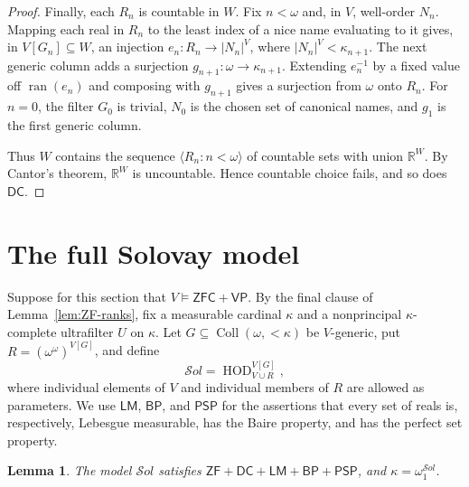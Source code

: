 \documentclass[11pt,a4paper]{amsart}
\newcommand{\VP}{\mathsf{VP}}
\newcommand{\ZF}{\mathsf{ZF}}
\newcommand{\ZFC}{\mathsf{ZFC}}
\newcommand{\HOD}{\operatorname{HOD}}
\newcommand{\Coll}{\operatorname{Coll}}
\newcommand{\DC}{\mathsf{DC}}
\newcommand{\LM}{\mathsf{LM}}
\newcommand{\BP}{\mathsf{BP}}
\newcommand{\PSP}{\mathsf{PSP}}
\theoremstyle{plain}
\newtheorem{lemma}[theorem]{Lemma}
\theoremstyle{definition}
\theoremstyle{remark}
\begin{document}
\begin{proof}
Finally, each $R_n$ is countable in $W$.  {Fix $n<\omega$ and, in $V$, well-order $N_n$.  Mapping each real in $R_n$ to the least index of a nice name evaluating to it gives, in $V[G_n]\subseteq W$, an injection $e_n:R_n\longrightarrow |N_n|^V$, where $|N_n|^V<\kappa_{n+1}$.
{The next generic column adds a surjection $g_{n+1}:\omega\to\kappa_{n+1}$.  Extending $e_n^{-1}$ by a fixed value off $\operatorname{ran}(e_n)$ and composing with $g_{n+1}$ gives a surjection from $\omega$ onto $R_n$.  For $n=0$, the filter $G_0$ is trivial, $N_0$ is the chosen set of canonical names, and $g_1$ is the first generic column.}}

Thus $W$ contains the sequence $\langle R_n:n<\omega\rangle$ of countable sets with union $\mathbb R^W$.  By Cantor's theorem, $\mathbb R^W$ is uncountable.  Hence countable choice fails, and so does $\DC$.
\end{proof}
\endgroup

\section{The full Solovay model}

Suppose for this section that $V\models\ZFC+\VP$.  By the final clause of Lemma~\ref{lem:ZF-ranks}, fix a measurable cardinal $\kappa$ and a nonprincipal $\kappa$-complete ultrafilter $U$ on $\kappa$.  Let
$G\subseteq{\Coll}(\omega,{<}\kappa)$ be $V$-generic, put
$R=(\omega^\omega)^{V[G]}$, and define
\begin{equation}\label{eq:full-Solovay}
\mathcal S\!ol=\HOD_{V\cup R}^{V[G]},
\end{equation}
where individual elements of $V$ and individual members of $R$ are allowed as parameters.  We use $\LM$, $\BP$, and $\PSP$ for the assertions that every set of reals is, respectively, Lebesgue measurable, has the Baire property, and has the perfect set property.

\begin{lemma}\label{lem:Solovay-regularity}
The model $\mathcal S\!ol$ satisfies
$\ZF+\DC+\LM+\BP+\PSP$, and $\kappa=\omega_1^{\mathcal S\!ol}$.
\end{lemma}
\end{document}

